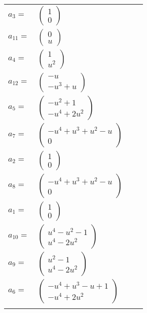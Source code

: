 \documentclass[1p]{elsarticle_modified}
\theoremstyle{definition}
\begin{document}
\begin{tabular}{m{7pt} m{180pt} m{7pt} m{180pt} }
\flushright $a_{3}=$&$\begin{pmatrix}1\\0\end{pmatrix}$ \\
\flushright $a_{11}=$&$\begin{pmatrix}0\\u\end{pmatrix}$ \\
\flushright $a_{4}=$&$\begin{pmatrix}1\\u^2\end{pmatrix}$ \\
\flushright $a_{12}=$&$\begin{pmatrix}- u\\- u^3+u\end{pmatrix}$ \\
\flushright $a_{5}=$&$\begin{pmatrix}- u^2+1\\- u^4+2 u^2\end{pmatrix}$ \\
\flushright $a_{7}=$&$\begin{pmatrix}- u^4+u^3+u^2- u\\0\end{pmatrix}$ \\
\flushright $a_{2}=$&$\begin{pmatrix}1\\0\end{pmatrix}$ \\
\flushright $a_{8}=$&$\begin{pmatrix}- u^4+u^3+u^2- u\\0\end{pmatrix}$ \\
\flushright $a_{1}=$&$\begin{pmatrix}1\\0\end{pmatrix}$ \\
\flushright $a_{10}=$&$\begin{pmatrix}u^4- u^2-1\\u^4-2 u^2\end{pmatrix}$ \\
\flushright $a_{9}=$&$\begin{pmatrix}u^2-1\\u^4-2 u^2\end{pmatrix}$ \\
\flushright $a_{6}=$&$\begin{pmatrix}- u^4+u^3- u+1\\- u^4+2 u^2\end{pmatrix}$\\&\end{tabular}
\end{document}
